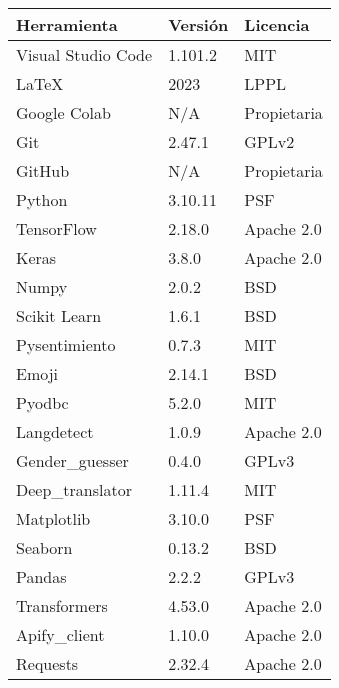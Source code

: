 \begin{table}[H]
	\centering
	\begin{tabularx}{\linewidth}{ p{} p{} p{} }
		\toprule
		\textbf{Herramienta}    & \textbf{Versión}      &\textbf{Licencia}\\
        \toprule
		Visual Studio Code      & 1.101.2               & MIT \\
        LaTeX                   & 2023                  & LPPL \\
        Google Colab            & N/A                   & Propietaria \\
        Git                     & 2.47.1                & GPLv2 \\
        GitHub                  & N/A                   & Propietaria \\
        Python                  & 3.10.11               & PSF \\
        TensorFlow              & 2.18.0                & Apache 2.0 \\
        Keras                   & 3.8.0                 & Apache 2.0 \\
        Numpy                   & 2.0.2                 & BSD \\
        Scikit Learn            & 1.6.1                 & BSD \\
        Pysentimiento           & 0.7.3                 & MIT \\
        Emoji                   & 2.14.1                & BSD \\
        Pyodbc                  & 5.2.0                 & MIT \\
        Langdetect              & 1.0.9                 & Apache 2.0 \\
        Gender\_guesser         & 0.4.0                 & GPLv3 \\
        Deep\_translator        & 1.11.4                & MIT \\
        Matplotlib              & 3.10.0                & PSF \\
        Seaborn                 & 0.13.2                & BSD \\
        Pandas                  & 2.2.2                 & GPLv3 \\
        Transformers            & 4.53.0                & Apache 2.0 \\
        Apify\_client           & 1.10.0                & Apache 2.0 \\
        Requests                & 2.32.4                & Apache 2.0 \\

\end{tabularx}
\end{table}
